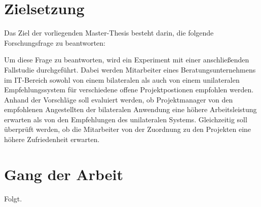 \section{Zielsetzung}
\label{sec:intro:zielsetzung}
Das Ziel der vorliegenden Master-Thesis besteht darin, die folgende Forschungsfrage zu beantworten:

\forschungsfrage

Um diese Frage zu beantworten, wird ein Experiment mit einer anschließenden Fallstudie durchgeführt. Dabei werden Mitarbeiter eines Beratungsunternehmens im IT-Bereich sowohl von einem bilateralen als auch von einem unilateralen Empfehlungssystem für verschiedene offene Projektpostionen empfohlen werden. Anhand der Vorschläge soll evaluiert werden, ob Projektmanager von den empfohlenen Angestellten der bilateralen Anwendung eine höhere Arbeitsleistung erwarten als von den Empfehlungen des unilateralen Systems. Gleichzeitig soll überprüft werden, ob die Mitarbeiter von der Zuordnung zu den Projekten eine höhere Zufriedenheit erwarten.

\section{Gang der Arbeit}
\label{sec:intro:gangDerArbeit}
Folgt.

